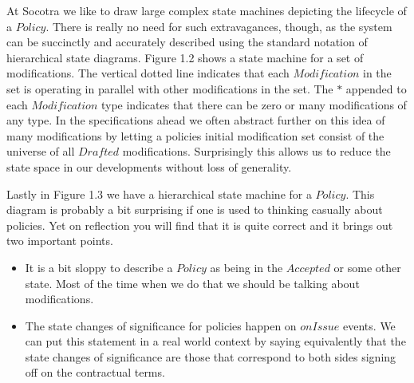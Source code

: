 
At Socotra we like to draw large complex state machines depicting the lifecycle of a $Policy$. There is really no need
for such extravagances, though, as the system can be succinctly and accurately described using the
standard notation of hierarchical state diagrams. Figure 1.2 shows a state machine for a set of modifications. The vertical
dotted line indicates that each $Modification$ in the set is operating in parallel with other modifications in the set. The
$*$ appended to each $Modification$ type indicates that there can be zero or many modifications of any type. In the
specifications ahead we often abstract further on this idea of many modifications by letting a policies initial
modification set consist of the universe of all $Drafted$ modifications. Surprisingly this allows us to reduce the
state space in our developments without loss of generality.

Lastly in Figure 1.3 we have a hierarchical state machine for a $Policy$. This diagram is probably
a bit surprising if one is used to thinking casually about policies. Yet on reflection you will
find that it is quite correct and it brings out two important points.
\begin{itemize}
\item It is a bit sloppy to describe a $Policy$ as being in the $Accepted$ or some other state.
  Most of the time when we do that we should be talking about modifications.
\item The state changes of significance for policies happen on $onIssue$ events. We can put this statement in
  a real world context by saying equivalently that the state changes of significance are those that
  correspond to both sides signing off on the contractual terms.
\end{itemize}

